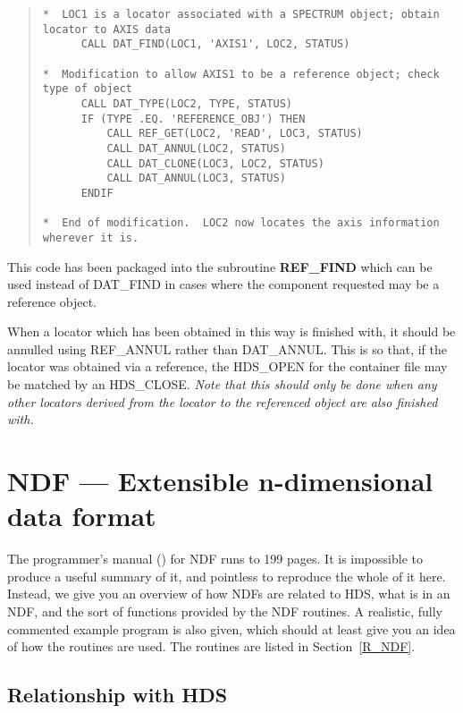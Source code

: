 \begin{quote}

\begin{small}
\begin{verbatim}
*  LOC1 is a locator associated with a SPECTRUM object; obtain locator to AXIS data
      CALL DAT_FIND(LOC1, 'AXIS1', LOC2, STATUS)

*  Modification to allow AXIS1 to be a reference object; check type of object
      CALL DAT_TYPE(LOC2, TYPE, STATUS)
      IF (TYPE .EQ. 'REFERENCE_OBJ') THEN
          CALL REF_GET(LOC2, 'READ', LOC3, STATUS)
          CALL DAT_ANNUL(LOC2, STATUS)
          CALL DAT_CLONE(LOC3, LOC2, STATUS)
          CALL DAT_ANNUL(LOC3, STATUS)
      ENDIF

*  End of modification.  LOC2 now locates the axis information wherever it is.
\end{verbatim}
\end{small}

\end{quote}
This code has been packaged into the subroutine {\bf REF\_FIND} which can be
used instead of DAT\_FIND in cases where the component requested may be a
reference object.

When a locator which has been obtained in this way is finished with, it should
be annulled using REF\_ANNUL rather than DAT\_ANNUL. 
This is so that, if the locator was obtained via a reference, the HDS\_OPEN for
the container file may be matched by an HDS\_CLOSE.
{\em Note that this should only be done when any other locators derived from
the locator to the referenced object are also finished with.}

\section{NDF --- Extensible n-dimensional data format}
\label{S_progndf}

The programmer's manual () for NDF runs to 199 pages.
It is impossible to produce a useful summary of it, and pointless to reproduce
the whole of it here.
Instead, we give you an overview of how NDFs are related to HDS, what is in an
NDF, and the sort of functions provided by the NDF routines.
A realistic, fully commented example program is also given, which should at
least give you an idea of how the routines are used.
The routines are listed in Section~\ref{R_NDF}.

\subsection{Relationship with HDS}

